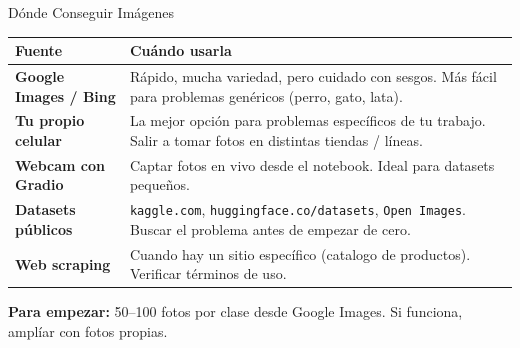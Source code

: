 \documentclass[aspectratio=169, 11pt]{beamer}
\begin{document}
\begin{frame}[shrink]{D\'onde Conseguir Im\'agenes}
  \vspace{6pt}
  {\footnotesize
  \begin{tabular}{@{}p{3.8cm} p{8.5cm}@{}}
    \toprule
    \textbf{Fuente} & \textbf{Cu\'ando usarla} \\
    \midrule
    \rowcolor{arcaGray}
    \textbf{Google Images / Bing}
    & R\'apido, mucha variedad, pero cuidado con sesgos.
      M\'as f\'acil para problemas gen\'ericos (perro, gato, lata). \\
    \textbf{Tu propio celular}
    & La mejor opci\'on para problemas espec\'ificos de tu trabajo.
      Salir a tomar fotos en distintas tiendas / l\'ineas. \\
    \rowcolor{arcaGray}
    \textbf{Webcam con Gradio}
    & Captar fotos en vivo desde el notebook. Ideal para
      datasets peque\~nos. \\
    \textbf{Datasets p\'ublicos}
    & \texttt{kaggle.com}, \texttt{huggingface.co/datasets},
      \texttt{Open Images}. Buscar el problema antes de empezar de cero. \\
    \rowcolor{arcaGray}
    \textbf{Web scraping}
    & Cuando hay un sitio espec\'ifico (catalogo de productos).
      Verificar t\'erminos de uso. \\
    \bottomrule
  \end{tabular}
  }

  \vspace{8pt}
  \begin{tcolorbox}[colback=codeGreen!8, colframe=codeGreen, boxrule=0.5pt,
    arc=2pt, left=6pt, right=6pt, top=4pt, bottom=4pt]
    {\scriptsize\color{arcaDark}
    \faKey\hspace{4pt}\textbf{Para empezar:} 50--100 fotos por clase
    desde Google Images. Si funciona, ampl\'iar con fotos propias.}
  \end{tcolorbox}
\end{frame}
\end{document}

